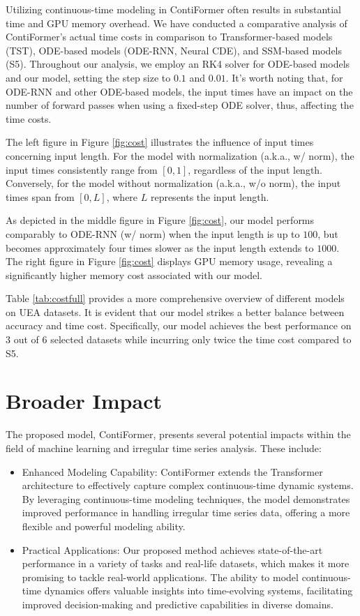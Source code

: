 Utilizing continuous-time modeling in ContiFormer often results in substantial time and GPU memory overhead. We have conducted a comparative analysis of ContiFormer's actual time costs in comparison to Transformer-based models (TST), ODE-based models (ODE-RNN, Neural CDE), and SSM-based models (S5). Throughout our analysis, we employ an RK4 solver for ODE-based models and our model, setting the step size to $0.1$ and $0.01$. It's worth noting that, for ODE-RNN and other ODE-based models, the input times have an impact on the number of forward passes when using a fixed-step ODE solver, thus, affecting the time costs.

The left figure in Figure \ref{fig:cost} illustrates the influence of input times concerning input length. For the model with normalization (a.k.a., w/ norm), the input times consistently range from $[0,1]$, regardless of the input length. Conversely, for the model without normalization (a.k.a., w/o norm), the input times span from $[0, L]$, where $L$ represents the input length.

As depicted in the middle figure in Figure \ref{fig:cost}, our model performs comparably to ODE-RNN (w/ norm) when the input length is up to $100$, but becomes approximately four times slower as the input length extends to $1000$. The right figure in Figure \ref{fig:cost} displays GPU memory usage, revealing a significantly higher memory cost associated with our model.

Table \ref{tab:costfull} provides a more comprehensive overview of different models on UEA datasets. It is evident that our model strikes a better balance between accuracy and time cost. Specifically, our model achieves the best performance on 3 out of 6 selected datasets while incurring only twice the time cost compared to S5.

\newpage
\section{Broader Impact}

The proposed model, ContiFormer, presents several potential impacts within the field of machine learning and irregular time series analysis. These include:
\begin{itemize}[leftmargin=5mm]
    \item Enhanced Modeling Capability: ContiFormer extends the Transformer architecture to effectively capture complex continuous-time dynamic systems. By leveraging continuous-time modeling techniques, the model demonstrates improved performance in handling irregular time series data, offering a more flexible and powerful modeling ability.
    \item Practical Applications: Our proposed method achieves state-of-the-art performance in a variety of tasks and real-life datasets, which makes it more promising to tackle real-world applications. The ability to model continuous-time dynamics offers valuable insights into time-evolving systems, facilitating improved decision-making and predictive capabilities in diverse domains.
\end{itemize}